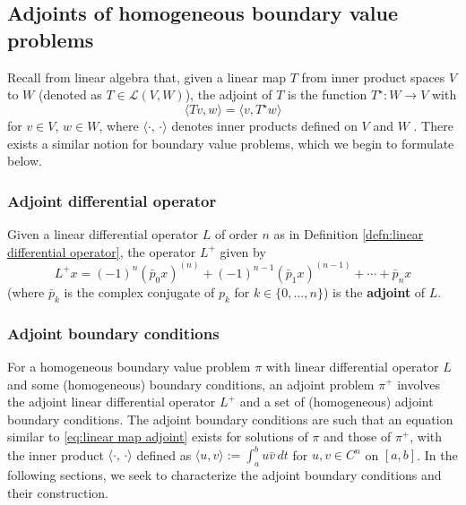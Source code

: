 \documentclass[12pt, oneside, a4paper]{article}
\begin{document}
\subsection{Adjoints of homogeneous boundary value problems}\label{sec:adjoints_of_homogeneous_BVPs}

Recall from linear algebra that, given a linear map $T$ from inner product spaces $V$ to $W$ (denoted as $T\in\mathcal{L}(V,W)$), the adjoint of $T$ is the function $T^\star:W\to V$ with
\begin{equation}\label{eq:linear map adjoint}
    \langle Tv, w\rangle = \langle v, T^\star w\rangle
\end{equation}
for $v\in V$, $w\in W$, where $\langle \cdot,\,\cdot \rangle$ denotes inner products defined on $V$ and $W$ \cite[p.204]{Axler1997}. There exists a similar notion for boundary value problems, which we begin to formulate below.

\subsubsection{Adjoint differential operator}
\begin{defn}\cite[p.84]{CoddingtonLevinson}\label{defn:adjoint linear differential operator}
    Given a linear differential operator $L$ of order $n$ as in Definition \ref{defn:linear differential operator}, the operator $L^+$ given by
    \[L^+x = (-1)^n (\bar{p}_0 x)^{(n)} + (-1)^{n-1}(\bar{p}_1 x)^{(n-1)} +\cdots +\bar{p}_nx\]
    (where $\bar{p}_k$ is the complex conjugate of $p_k$ for $k\in\{0,\ldots,n\}$) is the \textbf{adjoint} of $L$.
\end{defn}

\subsubsection{Adjoint boundary conditions}
For a homogeneous boundary value problem $\pi$ with linear differential operator $L$ and some (homogeneous) boundary conditions, an adjoint problem $\pi^+$ involves the adjoint linear differential operator $L^+$ and a set of (homogeneous) adjoint boundary conditions. The adjoint boundary conditions are such that an equation similar to \eqref{eq:linear map adjoint} exists for solutions of $\pi$ and those of $\pi^+$, with the inner product $\langle\cdot,\,\cdot\rangle$ defined as $\langle u,v\rangle := \int_a^b u\bar{v}\,dt$ for $u, v\in C^n$ on $[a,b]$. In the following sections, we seek to characterize the adjoint boundary conditions and their construction.
\end{document}
